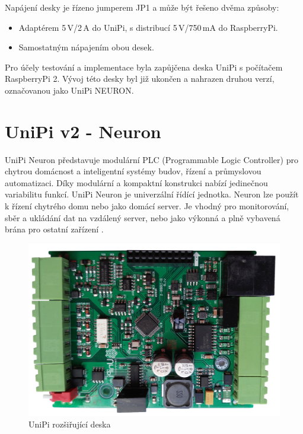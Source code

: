 Napájení desky je řízeno jumperem JP1 a může být řešeno dvěma způsoby:
\begin{itemize}
	\item Adaptérem 5\,V/2\,A do UniPi, s distribucí 5\,V/750\,mA do RaspberryPi.
	\item Samostatným nápajením obou desek.
\end{itemize}


Pro účely testování a implementace byla zapůjčena deska UniPi s počítačem RaspberryPi 2. Vývoj této desky byl již ukončen a nahrazen druhou verzí, označovanou jako UniPi NEURON.




\section{UniPi v2 - Neuron}
\label{KapitolaUnipi2}

UniPi Neuron představuje modulární PLC (Programmable Logic Controller) pro chytrou domácnost a inteligentní systémy budov, řízení a průmyslovou automatizaci. Díky modulární a kompaktní konstrukci nabízí jedinečnou variabilitu funkcí. UniPi Neuron je univerzální řídící jednotka. Neuron lze použít k řízení chytrého domu nebo jako domácí server. Je vhodný pro monitorování, sběr a ukládání dat na vzdálený server, nebo jako výkonná a plně vybavená brána pro ostatní zařízení \cite{UniPiBoard2}.

 \begin{figure}[!ht]
  \begin{center}
    \includegraphics[scale=0.25]{obrazky/unipi_unipi_deska}
  \end{center}
  \caption{UniPi rozšiřující deska}
	\label{UnipiV2DeskaUnipi}
\end{figure}

